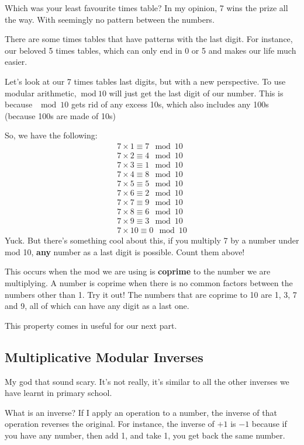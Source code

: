 \documentclass{article}
\newcommand{\inmod}{\ \text{mod}\ }
\begin{document}
  Which was your least favourite times table? In my opinion, 7 wins the prize all the way. With seemingly no pattern between the numbers.

  There are some times tables that have patterns with the last digit. For instance, our beloved 5 times tables, which can only end in 0 or 5 and makes our life much easier.

  Let's look at our 7 times tables last digits, but with a new perspective. To use modular arithmetic, $\inmod 10$ will just get the last digit of our number. This is because $\mod 10$ gets rid of any excess 10s, which also includes any 100s (because 100s are made of 10s)

  So, we have the following:
  \begin{align}
    7 \times 1 \equiv 7 \mod 10 \\
    7 \times 2 \equiv 4 \mod 10 \\
    7 \times 3 \equiv 1 \mod 10 \\
    7 \times 4 \equiv 8 \mod 10 \\
    7 \times 5 \equiv 5 \mod 10 \\
    7 \times 6 \equiv 2 \mod 10 \\
    7 \times 7 \equiv 9 \mod 10 \\
    7 \times 8 \equiv 6 \mod 10 \\
    7 \times 9 \equiv 3 \mod 10 \\
    7 \times 10 \equiv 0 \mod 10 
  \end{align}
  Yuck. But there's something cool about this, if you multiply 7 by a number under mod 10, \textbf{any} number as a last digit is possible. Count them above!

  This occurs when the mod we are using is \textbf{coprime} to the number we are multiplying. A number is coprime when there is no common factors between the numbers other than 1. Try it out! The numbers that are coprime to 10 are 1, 3, 7 and 9, all of which can have any digit as a last one.
  
  This property comes in useful for our next part.

  \subsection*{Multiplicative Modular Inverses}
  My god that sound scary. It's not really, it's similar to all the other inverses
  we have learnt in primary school.

  What is an inverse? If I apply an operation to a number, the inverse of that
  operation reverses the original. For instance, the inverse of $+1$ is $-1$
  because if you have any number, then add 1, and take 1, you get back the same
  number.
\end{document}
